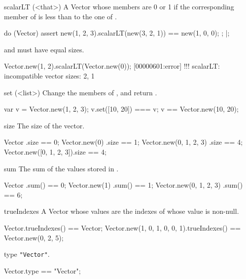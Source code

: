 \begin{urbiscriptapi}
\item[scalarLT](<that>)%
  A Vector whose members are 0 or 1 if the corresponding member of \this is
  less than to the one of \that.
\begin{urbiscript}
do (Vector)
{
  assert
  {
    new(1, 2, 3).scalarLT(new(3, 2, 1)) == new(1, 0, 0);
  };
}|;
\end{urbiscript}
  \this and \that must have equal sizes.
\begin{urbiscript}
Vector.new(1, 2).scalarLT(Vector.new(0));
[00000601:error] !!! scalarLT: incompatible vector sizes: 2, 1
\end{urbiscript}


\item[set](<list>)%
  Change the members of \this, and return \this.
\begin{urbiassert}
var v = Vector.new(1, 2, 3);
v.set([10, 20]) === v;
v == Vector.new(10, 20);
\end{urbiassert}


\item[size]%
  The size of the vector.
\begin{urbiassert}
Vector                  .size == 0;
Vector.new(0)           .size == 1;
Vector.new(0, 1, 2, 3)  .size == 4;
Vector.new([0, 1, 2, 3]).size == 4;
\end{urbiassert}


\item[sum]%
  The sum of the values stored in \this.
\begin{urbiassert}
Vector                  .sum() == 0;
Vector.new(1)           .sum() == 1;
Vector.new(0, 1, 2, 3)  .sum() == 6;
\end{urbiassert}


\item[trueIndexes]%
  A Vector whose values are the indexes of \this whose value is non-null.
\begin{urbiassert}
Vector.trueIndexes() == Vector;
Vector.new(1, 0, 1, 0, 0, 1).trueIndexes() == Vector.new(0, 2, 5);
\end{urbiassert}


\item[type]%
  \lstinline|"Vector"|.
\begin{urbiassert}
Vector.type == "Vector";
\end{urbiassert}
\end{urbiscriptapi}

